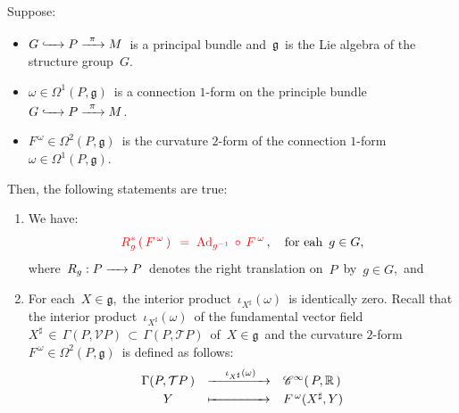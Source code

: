 \vskip 0.5cm
\begin{proposition}
\mbox{}
\vskip 0.1cm
\noindent
Suppose:
\begin{itemize}
\item
	\vskip -0.2cm
	$G \xhookrightarrow{{\color{white}222}} P \xrightarrow{{\color{white}2}\pi{\color{white}2}} M$\,
	is a principal bundle and
	\,$\mathfrak{g}$\, is the Lie algebra of the structure group \,$G$.\,
\item
	\vskip -0.1cm
	$\omega \in \Omega^{1}(P,\mathfrak{g})$\, is a connection $1$-form on the principle bundle
	$G \xhookrightarrow{{\color{white}222}} P \xrightarrow{{\color{white}2}\pi{\color{white}2}} M$.\,
\item
	$F^{\,\omega} \in \Omega^{2}(P,\mathfrak{g})$\, is the curvature $2$-form
	of the connection $1$-form $\omega \in \Omega^{1}(P,\mathfrak{g})$.\,
\end{itemize}
Then, the following statements are true:
\begin{enumerate}
\item
	We have:
	\begin{equation*}
	{\color{red}
	R_{g}^{*}\left(\,F^{\,\omega}\,\right)
	\;\, =\;
		\textnormal{Ad}_{g^{-1}} \,\circ\, F^{\,\omega}
		}\,,
		\quad
		\textnormal{for eah \,$g \in G$},
	\end{equation*}
	where \,$R_{g} : P \xrightarrow{{\color{white}222}} P$\,
	denotes the right translation on \,$P$\, by \,$g \in G$,\, and
\item
	For each \,$X \in \mathfrak{g}$,\, the interior product
	\,$\iota_{X^{\sharp}}(\omega)$\,
	is identically zero.
	\vskip 0.01cm
	Recall that the interior product
	\,$\iota_{X^{\sharp}}(\omega)$\,
	of the fundamental vector field
	\,$X^{\sharp} \,\in\, \Gamma(P,\mathcal{V}P) \,\subset\, \Gamma(P,\mathcal{T}P)$\,
	of \,$X \in \mathfrak{g}$\, and
	the curvature $2$-form
	\,$F^{\,\omega} \in \Omega^{2}(P,\mathfrak{g})$\,
	is defined as follows:
	\begin{equation*}
	\begin{array}{ccl}
	\Gamma\!\left(P,\mathcal{T}P\,\right)
	&
	\xrightarrow{{\color{white}222}\iota_{X^{\sharp}}(\omega){\color{white}22}}
	&
	\mathscr{C}^{\infty}\!\left(\,P,\Re\,\right)
	\\
	Y
	&
	\xmapsto{{\color{white}22222222222}}
	&
	F^{\,\omega}(X^{\sharp},Y)
	\end{array}
	\end{equation*}
\end{enumerate}
\end{proposition}
